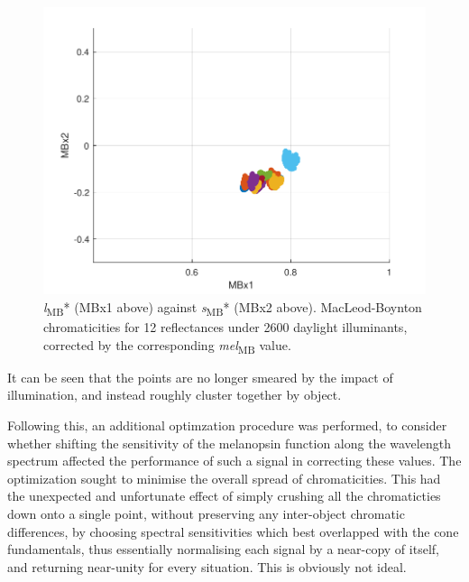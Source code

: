 \documentclass{article}
\begin{document}
\begin{figure}[ht]
    \centering
    \includegraphics[width=\textwidth]{figs/corrected.pdf}
    \caption{\textit{l}\textsubscript{MB}* (MBx1 above) against \textit{s}\textsubscript{MB}* (MBx2 above). MacLeod-Boynton chromaticities for 12 reflectances under 2600 daylight illuminants, corrected by the corresponding \textit{mel}\textsubscript{MB} value.}
    \label{fig:corrected}
\end{figure} 

It can be seen that the points are no longer smeared by the impact of illumination, and instead roughly cluster together by object.

Following this, an additional optimzation procedure was performed, to consider whether shifting the sensitivity of the melanopsin function along the wavelength spectrum affected the performance of such a signal in correcting these values. The optimization sought to minimise the overall spread of chromaticities. This had the unexpected and unfortunate effect of simply crushing all the chromaticties down onto a single point, without preserving any inter-object chromatic differences, by choosing spectral sensitivities which best overlapped with the cone fundamentals, thus essentially normalising each signal by a near-copy of itself, and returning near-unity for every situation. This is obviously not ideal.




\end{document}
